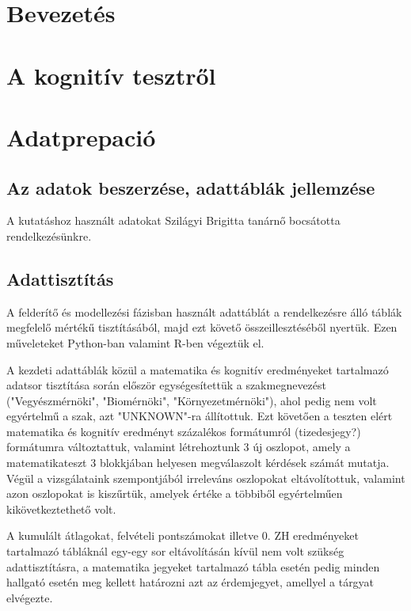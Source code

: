 \documentclass[12pt]{article}
\begin{document}
\tableofcontents


\section{Bevezetés}

\section{A kognitív tesztről}

\section{Adatprepació}

\subsection{Az adatok beszerzése, adattáblák jellemzése}

A kutatáshoz használt adatokat Szilágyi Brigitta tanárnő bocsátotta rendelkezésünkre.



\subsection{Adattisztítás}

A felderítő és modellezési fázisban használt adattáblát a rendelkezésre álló táblák megfelelő mértékű tisztításából, majd ezt követő összeillesztéséből nyertük. Ezen műveleteket Python-ban valamint R-ben végeztük el.

A kezdeti adattáblák közül a matematika és kognitív eredményeket tartalmazó adatsor tisztítása során először egységesítettük a szakmegnevezést ("Vegyészmérnöki", "Biomérnöki", "Környezetmérnöki"), ahol pedig nem volt egyértelmű a szak, azt "UNKNOWN"-ra állítottuk. Ezt követően a teszten elért matematika és kognitív eredményt százalékos formátumról (tizedesjegy?) formátumra változtattuk, valamint létrehoztunk 3 új oszlopot, amely a matematikateszt 3 blokkjában helyesen megválaszolt kérdések számát mutatja. Végül a vizsgálataink szempontjából irreleváns oszlopokat eltávolítottuk, valamint azon oszlopokat is kiszűrtük, amelyek értéke a többiből egyértelműen kikövetkeztethető volt. 

A kumulált átlagokat, felvételi pontszámokat illetve 0. ZH eredményeket tartalmazó tábláknál egy-egy sor eltávolításán kívül nem volt szükség adattisztításra, a matematika jegyeket tartalmazó tábla esetén pedig minden hallgató esetén meg kellett határozni azt az érdemjegyet, amellyel a tárgyat elvégezte.
\end{document}
